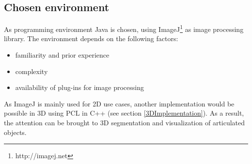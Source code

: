 \subsection{Chosen environment}
As programming environment Java is chosen, using ImageJ\footnote{http://imagej.net} as image processing library. The environment depends on the following factors:
\begin{itemize}
	\item familiarity and prior experience
	\item complexity
	\item availability of plug-ins for image processing
\end{itemize}
As ImageJ is mainly used for 2D use cases, another implementation would be possible in 3D using PCL in C++ (see section \ref{3DImplementation}). As a result, the attention can be brought to 3D segmentation and visualization of articulated objects.

